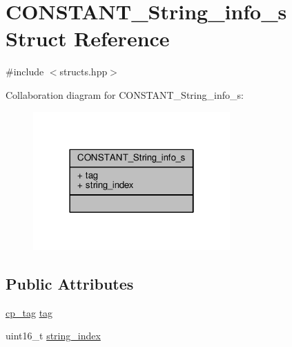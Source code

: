 \hypertarget{structCONSTANT__String__info__s}{\section{C\+O\+N\+S\+T\+A\+N\+T\+\_\+\+String\+\_\+info\+\_\+s Struct Reference}
\label{structCONSTANT__String__info__s}
}


{\ttfamily \#include $<$structs.\+hpp$>$}



Collaboration diagram for C\+O\+N\+S\+T\+A\+N\+T\+\_\+\+String\+\_\+info\+\_\+s\+:\nopagebreak
\begin{figure}[H]
\begin{center}
\leavevmode
\includegraphics[width=214pt]{structCONSTANT__String__info__s__coll__graph}
\end{center}
\end{figure}
\subsection*{Public Attributes}
\begin{DoxyCompactItemize}
\item 
\hyperlink{structs_8hpp_a17947ec3f3c1f2392eabd36c1ba5fec6}{cp\+\_\+tag} \hyperlink{structCONSTANT__String__info__s_a63a92aabe2638ad427f912551c99c18a}{tag}
\item 
uint16\+\_\+t \hyperlink{structCONSTANT__String__info__s_a9fb8030b5c3bbfca53934e67991399cf}{string\+\_\+index}
\end{DoxyCompactItemize}


